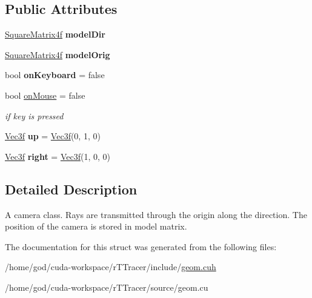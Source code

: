 \subsection*{Public Attributes}
\begin{DoxyCompactItemize}
\item 
\hyperlink{class_square_matrix4}{Square\+Matrix4f} {\bfseries model\+Dir}\hypertarget{struct_camera_aca61ca4fe4b4822de05bdc0881648dc5}{}\label{struct_camera_aca61ca4fe4b4822de05bdc0881648dc5}

\item 
\hyperlink{class_square_matrix4}{Square\+Matrix4f} {\bfseries model\+Orig}\hypertarget{struct_camera_ad8d667d7e8292ddef386fee085f981dd}{}\label{struct_camera_ad8d667d7e8292ddef386fee085f981dd}

\item 
bool {\bfseries on\+Keyboard} = false\hypertarget{struct_camera_ad0c8d1b86ab1589f62827e69336265c9}{}\label{struct_camera_ad0c8d1b86ab1589f62827e69336265c9}

\item 
bool \hyperlink{struct_camera_ac8c147911753dc1cf3a7a2b8219011c4}{on\+Mouse} = false\hypertarget{struct_camera_ac8c147911753dc1cf3a7a2b8219011c4}{}\label{struct_camera_ac8c147911753dc1cf3a7a2b8219011c4}

\begin{DoxyCompactList}\small\item\em if key is pressed \end{DoxyCompactList}\item 
\hyperlink{class_vec3}{Vec3f} {\bfseries up} = \hyperlink{class_vec3}{Vec3f}(0, 1, 0)\hypertarget{struct_camera_ace6326d21c5f4e8aad4314a99839bafd}{}\label{struct_camera_ace6326d21c5f4e8aad4314a99839bafd}

\item 
\hyperlink{class_vec3}{Vec3f} {\bfseries right} = \hyperlink{class_vec3}{Vec3f}(1, 0, 0)\hypertarget{struct_camera_a382a2d324a00da22f61d5694e3ba535e}{}\label{struct_camera_a382a2d324a00da22f61d5694e3ba535e}

\end{DoxyCompactItemize}


\subsection{Detailed Description}
A camera class. Rays are transmitted through the origin along the direction. The position of the camera is stored in model matrix. 

The documentation for this struct was generated from the following files\+:\begin{DoxyCompactItemize}
\item 
/home/god/cuda-\/workspace/r\+T\+Tracer/include/\hyperlink{r_t_tracer_2include_2geom_8cuh}{geom.\+cuh}\item 
/home/god/cuda-\/workspace/r\+T\+Tracer/source/geom.\+cu\end{DoxyCompactItemize}
